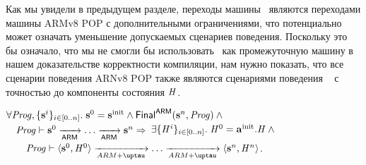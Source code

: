 Как мы увидели в предыдущем разделе, переходы машины \ARMt~являются
переходами машины ARMv8 POP с дополнительными ограничениями, что
потенциально может означать уменьшение допускаемых сценариев поведения.
Поскольку это бы означало, что мы не смогли бы использовать \ARMt~как промежуточную
машину в нашем доказательстве корректности компиляции,
нам нужно показать, что все сценарии поведения ARNv8 POP также являются сценариями
поведения \ARMt~ с точностью до компоненты состояния $\mathit{H}$.
\begin{theorem}
  \label{thm:armvpop:armt:sim}
$\forall \mathit{Prog}, \{\mathbf{s}^i\}_{i \in [0..n]}.\; \mathbf{s}^0 = \mathbf{s}^{\rm init}  \land \mathsf{Final}^{\mathsf{ARM}}(\mathbf{s}^n, \mathit{Prog}) \land{}$ \\
${} \quad \mathit{Prog} \vdash \mathbf{s}^0 \xrightarrow[\mathsf{ARM}]{} \dots \xrightarrow[\mathsf{ARM}]{} \mathbf{s}^n \Rightarrow$
$\exists \{\mathit{H}^i\}_{i \in [0..n]}. \; \mathit{H}^0 = \mathbf{a}^{\rm init}.\mathit{H} \land {}$ \\
${} \qquad \Cfarm \vdash \angled{\s^0, \hmap^0} \armStep \dots \armStep \angled{\s^n, \hmap^n}$.
\end{theorem}
